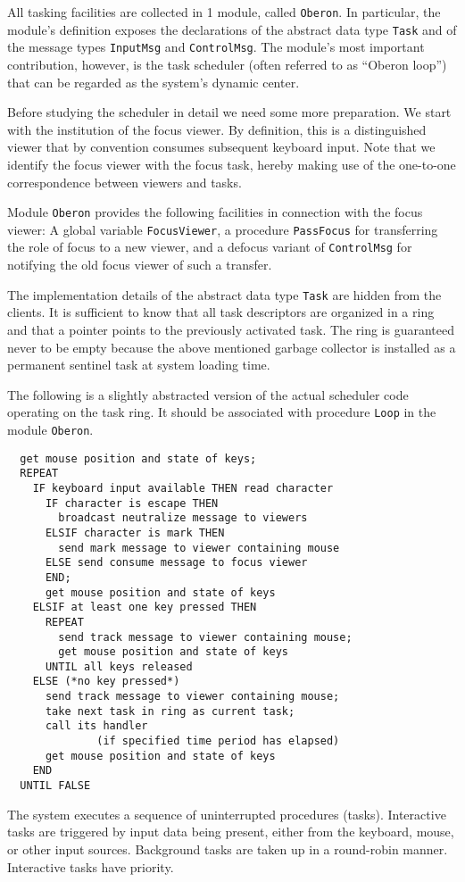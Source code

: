 All tasking facilities are collected in 1 module, called \verb|Oberon|. In particular, the
module's definition exposes the declarations of the abstract data type \verb|Task| and of
the message types \verb|InputMsg| and \verb|ControlMsg|. The module's most important
contribution, however, is the task scheduler (often referred to as “Oberon loop”)
that can be regarded as the system's dynamic center.

Before studying the scheduler in detail we need some more preparation. We start with the
institution of the focus viewer. By definition, this is a distinguished viewer that by
convention consumes subsequent keyboard input. Note that we identify the focus viewer with
the focus task, hereby making use of the one-to-one correspondence between viewers and tasks.

Module \verb|Oberon| provides the following facilities in connection with the focus viewer:
A global variable \verb|FocusViewer|, a procedure \verb|PassFocus| for transferring the role
of focus to a new viewer, and a defocus variant of \verb|ControlMsg| for notifying the old
focus viewer of such a transfer.

The implementation details of the abstract data type \verb|Task| are hidden from the clients.
It is sufficient to know that all task descriptors are organized in a ring and that a pointer
points to the previously activated task. The ring is guaranteed never to be empty because the
above mentioned garbage collector is installed as a permanent sentinel task at system loading time.

The following is a slightly abstracted version of the actual scheduler code operating on the
task ring. It should be associated with procedure \verb|Loop| in the module \verb|Oberon|.
\begin{verbatim}
  get mouse position and state of keys;
  REPEAT
    IF keyboard input available THEN read character
      IF character is escape THEN
        broadcast neutralize message to viewers
      ELSIF character is mark THEN
        send mark message to viewer containing mouse
      ELSE send consume message to focus viewer
      END;
      get mouse position and state of keys
    ELSIF at least one key pressed THEN
      REPEAT
        send track message to viewer containing mouse;
        get mouse position and state of keys
      UNTIL all keys released
    ELSE (*no key pressed*)
      send track message to viewer containing mouse;
      take next task in ring as current task;
      call its handler
              (if specified time period has elapsed)
      get mouse position and state of keys
    END 
  UNTIL FALSE
\end{verbatim}
The system executes a sequence of uninterrupted procedures (tasks). Interactive tasks are
triggered by input data being present, either from the keyboard, mouse, or other input sources.
Background tasks are taken up in a round-robin manner. Interactive tasks have priority.

